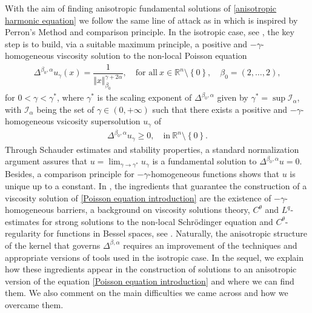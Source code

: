\documentclass[10pt, leqno]{article}
\theoremstyle{definition}
\theoremstyle{remark}
\numberwithin{equation}{section}
\begin{document}
With the aim of finding anisotropic fundamental solutions of \eqref{anisotropic harmonic equation} we follow the same line of attack as in \cite{ASS 1, ASS 2, CWW} which is inspired by Perron's Method and comparison principle. In the isotropic case, see \cite{CWW}, the key step is to build, via a suitable maximum principle, a positive and $-\gamma$-homogeneous viscosity solution to the non-local Poisson equation
\begin{eqnarray}
\label{Poisson equation introduction}
\Delta^{\beta_{0},\alpha}u_{\gamma}(x) = \dfrac{1}{\Vert  x \Vert_{\beta_{0}}^{\gamma + 2\alpha}}, \quad \text{for all} \ x\in \mathbb{R}^{n} \setminus \left\lbrace 0 \right\rbrace, \quad \beta_{0}=(2, \dots, 2),
\end{eqnarray}
for $0 < \gamma < \gamma^{\ast}$, where $\gamma^{\ast}$ is the scaling exponent of $\Delta^{\beta_{0},\alpha}$ given by $\gamma^{\ast} = \sup\mathcal{I}_{\alpha}$, with $\mathcal{I}_{\alpha}$ being the set of $\gamma \in (0, +\infty)$ such that there exists a positive and $-\gamma$-homogeneous vsicosity supersolution $u_{\gamma}$ of
\begin{eqnarray}
\Delta^{\beta_{0},\alpha}u_{\gamma} \geq 0 , \quad \text{in} \ \mathbb{R}^{n} \setminus \left\lbrace 0 \right\rbrace.
\end{eqnarray}
Through Schauder estimates and stability properties, a standard normalization argument assures that $u = \lim_{\gamma \rightarrow \gamma^{\ast}} u_{\gamma}$ is a fundamental solution to $\Delta^{\beta_{0},\alpha}u = 0$. Besides, a comparison principle for $-\gamma$-homogeneous functions shows that $u$ is unique up to a constant. In \cite{CWW}, the ingredients that guarantee the construction of a viscosity solution of \eqref{Poisson equation introduction} are the existence of $-\gamma$-homogeneous barriers, a background on viscosity solutions theory, $C^{\theta}$ and $L^{q}$-estimates for strong solutions to the non-local Schr\" odinger equation and $C^{\theta}$-regularity for functions in Bessel spaces, see \cite{CS,DK,STEIN,NPV}. Naturally, the anisotropic structure of the kernel that governs $\Delta^{\beta, \alpha}$ requires an improvement of the techniques and appropriate versions of tools used in the isotropic case. In the sequel, we explain how these ingredients appear in the construction of solutions to an anisotropic version of the equation \eqref{Poisson equation introduction} and where we can find them. We also comment on the main difficulties we came across and how we overcame them.
\end{document}

